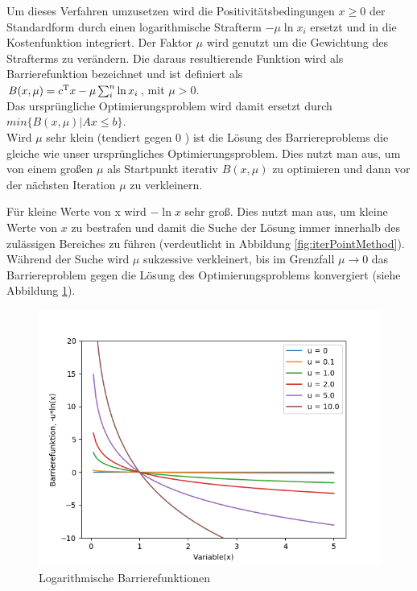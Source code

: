 \documentclass{like}
\begin{document}
Um dieses Verfahren umzusetzen wird die Positivitätsbedingungen $x \geq 0$ der Standardform durch einen logarithmische Strafterm $-\mu \ln x_i $  ersetzt und in die Kostenfunktion integriert. 
Der Faktor $\mu$ wird genutzt um die Gewichtung des Strafterms zu verändern.
Die daraus resultierende Funktion wird als Barrierefunktion bezeichnet und ist definiert als \\
$B(x,\mu) =  c\textsuperscript{T}x - \mu \sum_{i}^{n} \ln x_i$, mit $\mu > 0$. \\
Das ursprüngliche Optimierungsproblem wird damit ersetzt durch 
$min \{B(x,\mu) | Ax \leq b\}$.\\
Wird \(\mu\) sehr klein (tendiert gegen \(0\) ) ist die Lösung des Barriereproblems die gleiche wie unser ursprüngliches Optimierungsproblem. Dies nutzt man aus, um von einem großen \(\mu\) als Startpunkt iterativ $B(x,\mu)$ zu optimieren und dann vor der nächsten Iteration \(\mu\) zu verkleinern.

Für kleine Werte von x wird $-\ln x $ sehr groß. Dies nutzt man aus, um kleine Werte von \(x\) zu bestrafen und damit die Suche der Lösung immer innerhalb des zulässigen Bereiches zu führen (verdeutlicht in Abbildung \ref{fig:iterPointMethod}). Während der Suche wird \(\mu\) sukzessive verkleinert, bis im Grenzfall $ \mu \rightarrow 0$ das Barriereproblem gegen die Lösung des Optimierungsproblems konvergiert (siehe Abbildung \ref{fig:iterPointLn}).\\

\begin{figure}[ht!]
	\centering
	\includegraphics[width=350pt]{Abbildungen/intPointLn.png}
	\caption{Logarithmische Barrierefunktionen}
	\label{fig:iterPointLn}
\end{figure}
\end{document}
